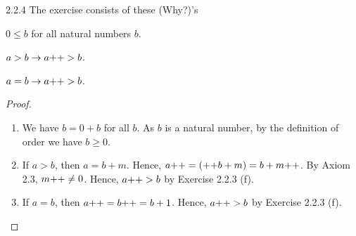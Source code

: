 \begin{exercise}{2.2.4}
The exercise consists of these (Why?)'s
\begin{why}{23}
$0 \le b$ for all natural numbers $b$.
\end{why}
\begin{why}{23}
$a>b \to a{+}{+}>b$.
\end{why}
\begin{why}{23}
$a=b \to a{+}{+}>b$.
\end{why}
\end{exercise}
\begin{proof}\leavevmode
\begin{enumerate}
	\item We have $b=0+b$ for all $b$. As $b$ is a natural number, by the definition of order we have $b \ge 0$.
	\item If $a>b$, then $a=b+m$. Hence, $a{+}{+} = ({+}{+}b+m) = b+m{+}{+}$. By Axiom 2.3, $m{+}{+} \ne 0$. Hence, $a{+}{+} > b$ by Exercise 2.2.3 (f).
	\item If $a=b$, then $a{+}{+} = b{+}{+} = b+1$. Hence, $a{+}{+} > b$ by Exercise 2.2.3 (f).
\end{enumerate}
\end{proof}

